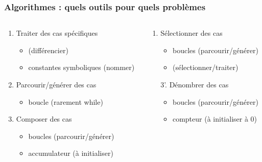 \documentclass[xcolor=pdftex,svgnames,table]{beamer}
\begin{document}
\begin{frame}
  \frametitle{Algorithmes : quels outils pour quels problèmes\nowrite}
\pause
\begin{columns}
 \begin{column}[t]{0.59\linewidth}
  \begin{enumerate}
    \item  Traiter des cas spécifiques
      \begin{itemize}
      \item \alert{} (différencier)
      \item \alert{} constantes symboliques (nommer)
     \end{itemize}\pause
    \item Parcourir/générer des cas\pause
      \begin{itemize}
      \item \alert{boucle } (rarement while)
      \end{itemize}\pause
   \item Composer des cas
      \begin{itemize}
        \item boucles (parcourir/générer)
        \pause
      \item \alert{accumulateur} (à initialiser)
      \end{itemize}\pause
\setcounter{savedenumi}{\value{enumi}}
\end{enumerate}
\end{column}\hspace{-1cm}
\pause
\begin{column}[t]{0.59\linewidth}
\begin{enumerate}
\setcounter{enumi}{\value{savedenumi}}
   \item Sélectionner des cas
      \begin{itemize}
        \item boucles (parcourir/générer)
        \item \alert{}  (sélectionner/traiter)
      \end{itemize}\pause
    \item[3'.] Dénombrer des cas
      \begin{itemize}
        \item boucles (parcourir/générer)
          \pause
        \item \alert{compteur} (à initialiser à 0)

\end{itemize}
\end{enumerate}
\end{column}
\end{columns}
\end{frame}
\end{document}
